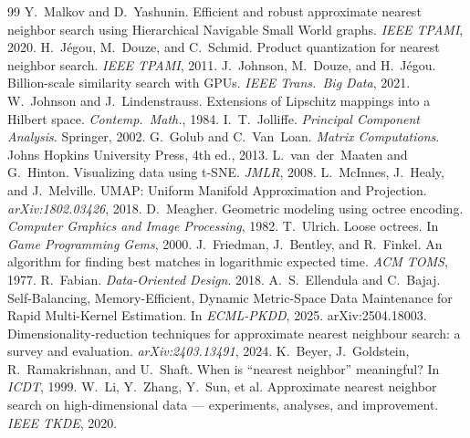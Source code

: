 \documentclass[11pt]{article}
\begin{document}
\begin{thebibliography}{99}
 Y.~Malkov and D.~Yashunin. Efficient and robust approximate nearest
neighbor search using Hierarchical Navigable Small World graphs. \emph{IEEE TPAMI},
2020.
 H.~J\'egou, M.~Douze, and C.~Schmid. Product quantization for
nearest neighbor search. \emph{IEEE TPAMI}, 2011.
 J.~Johnson, M.~Douze, and H.~J\'egou. Billion-scale similarity
search with GPUs. \emph{IEEE Trans.\ Big Data}, 2021.
 W.~Johnson and J.~Lindenstrauss. Extensions of Lipschitz mappings into
a Hilbert space. \emph{Contemp.\ Math.}, 1984.
 I.~T.~Jolliffe. \emph{Principal Component Analysis}. Springer, 2002.
 G.~Golub and C.~Van~Loan. \emph{Matrix Computations}. Johns
Hopkins University Press, 4th ed., 2013.
 L.~van~der~Maaten and G.~Hinton. Visualizing data using t-SNE.
\emph{JMLR}, 2008.
 L.~McInnes, J.~Healy, and J.~Melville. UMAP: Uniform Manifold
Approximation and Projection. \emph{arXiv:1802.03426}, 2018.
 D.~Meagher. Geometric modeling using octree encoding.
\emph{Computer Graphics and Image Processing}, 1982.
 T.~Ulrich. Loose octrees. In \emph{Game Programming Gems}, 2000.
 J.~Friedman, J.~Bentley, and R.~Finkel. An algorithm for finding
best matches in logarithmic expected time. \emph{ACM TOMS}, 1977.
 R.~Fabian. \emph{Data-Oriented Design}. 2018.
 A.~S.~Ellendula and C.~Bajaj. Self-Balancing, Memory-Efficient,
Dynamic Metric-Space Data Maintenance for Rapid Multi-Kernel Estimation. In
\emph{ECML-PKDD}, 2025. arXiv:2504.18003.
 Dimensionality-reduction techniques for approximate nearest
neighbour search: a survey and evaluation. \emph{arXiv:2403.13491}, 2024.
 K.~Beyer, J.~Goldstein, R.~Ramakrishnan, and U.~Shaft. When is
``nearest neighbor'' meaningful? In \emph{ICDT}, 1999.
 W.~Li, Y.~Zhang, Y.~Sun, et al. Approximate nearest neighbor
search on high-dimensional data --- experiments, analyses, and improvement.
\emph{IEEE TKDE}, 2020.
\end{thebibliography}
\end{document}
